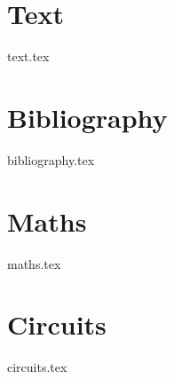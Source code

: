 \documentclass{report}
\begin{document}
\chapter{Text}
    {text.tex}
\chapter{Bibliography}
    {bibliography.tex}
\chapter{Maths}
    {maths.tex}
\chapter{Circuits}
    {circuits.tex}
\end{document}

